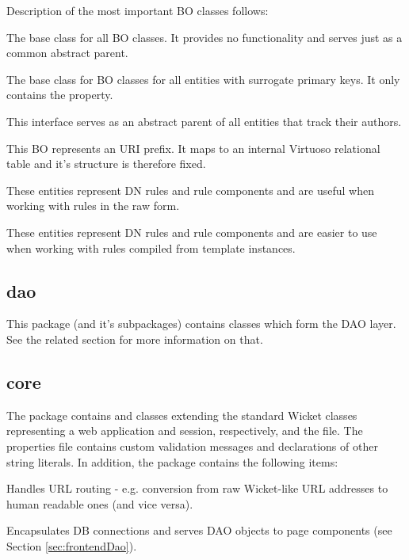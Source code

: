 Description of the most important BO classes follows:

\begin{description}[style=nextline,font=\ttfamily]
	\item[BusinessEntity] The base class for all BO classes. It provides no functionality and serves just as a common abstract parent.
	\item[EntityWithSurrogateKey] The base class for BO classes for all entities with surrogate primary keys. It only contains the  property.
	\item[AuthoredEntity] This interface serves as an abstract parent of all entities that track their authors.
	\item[Prefix] This BO represents an URI prefix. It maps to an internal Virtuoso relational table and it's structure is therefore fixed.
	\item[DNRule and DNRuleComponent] These entities represent DN rules and rule components and are useful when working with rules in the raw form.
	\item[CompiledDNRule and CompiledDNRuleComponent] These entities represent DN rules and rule components and are easier to use when working with rules compiled from template instances.
\end{description}

\subsection{dao}

This package (and it's subpackages) contains classes which form the DAO layer. See the related section for more information on that.

\subsection{core}

The  package contains  and \linebreak classes extending the standard Wicket classes representing a web application and session, respectively, and the  file. The properties file contains custom validation messages and declarations of other string literals. In addition, the package contains the following items:

\begin{description}[style=nextline,font=\ttfamily]
	\item[URLRouter] Handles URL routing - e.g. conversion from raw Wicket-like URL addresses to human readable ones (and vice versa).
	\item[DaoLookupFactory] Encapsulates DB connections and serves DAO objects to page components (see Section \ref{sec:frontendDao}).
\end{description}

